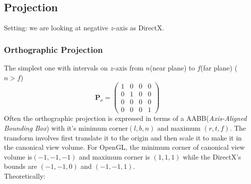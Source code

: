 \documentclass[10pt, a4paper]{article}
\begin{document}
        \subsection{Projection}
            Setting: we are looking at negative $z$-axis as DirectX.
            \subsubsection{Orthographic Projection}
                The simplest one with intervals on $z$-axis from $n$(near plane) to $f$(far plane) ($n > f$)
                \begin{equation*}
                    \textbf{P}_o = 
                    \begin{pmatrix}
                        1 & 0 & 0 & 0 \\
                        0 & 1 & 0 & 0 \\
                        0 & 0 & 0 & 0 \\
                        0 & 0 & 0 & 1 
                    \end{pmatrix} 
                \end{equation*} 
            \indent Often the orthographic projection is expressed in terms of a AABB(\emph{Axis-Aligned Bounding Box}) with it's minimum corner$(l, b, n)$ and maximum $(r, t, f)$. The transform involves first translate it to the origin and then scale it to make it in the canonical view volume. For OpenGL, the minimum corner of canonical view volume is$(-1, -1, -1)$ and maximum corner is $(1, 1, 1)$ while the DirectX's bounds are $(-1, -1, 0)$ and $(-1, -1, 1)$.\\
            \indent Theoretically: 
\end{document}
